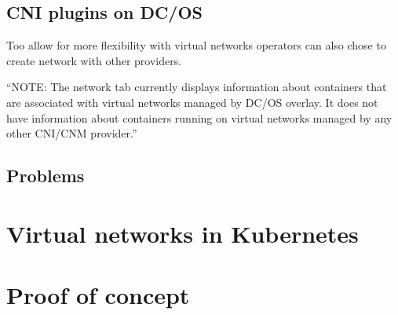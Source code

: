 \subsection{CNI plugins on DC/OS}
Too allow for more flexibility with virtual networks operators can also chose to create network with other providers.
\begin{displayquote}
    ``NOTE: The network tab currently displays information about containers that are associated with virtual networks managed by DC/OS overlay. It does not have information about containers running on virtual networks managed by any other CNI/CNM provider.'' %
\end{displayquote}



\subsection{Problems}

\section{Virtual networks in Kubernetes}

\section{Proof of concept}
